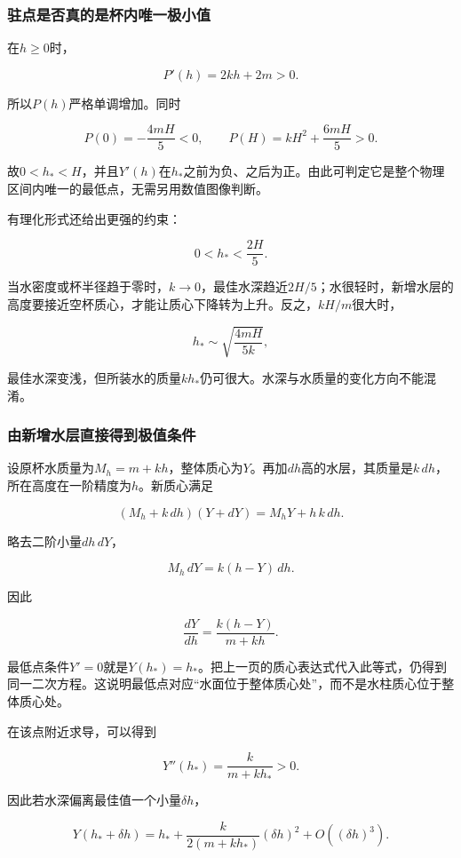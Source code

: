 \documentclass[12pt,a4paper,fontset=fandol]{ctexart}
\begin{document}
\subsubsection{驻点是否真的是杯内唯一极小值}\label{ux9a7bux70b9ux662fux5426ux771fux7684ux662fux676fux5185ux552fux4e00ux6781ux5c0fux503c}

在\(h\ge0\)时，

\[
P'(h)=2kh+2m>0.
\]

所以\(P(h)\)严格单调增加。同时

\[
P(0)=-\frac{4mH}{5}<0,\qquad
P(H)=kH^2+\frac{6mH}{5}>0.
\]

故\(0<h_*<H\)，并且\(Y'(h)\)在\(h_*\)之前为负、之后为正。由此可判定它是整个物理区间内唯一的最低点，无需另用数值图像判断。

有理化形式还给出更强的约束：

\[
0<h_*<\frac{2H}{5}.
\]

当水密度或杯半径趋于零时，\(k\to0\)，最佳水深趋近\(2H/5\)；水很轻时，新增水层的高度要接近空杯质心，才能让质心下降转为上升。反之，\(kH/m\)很大时，

\[
h_*\sim \sqrt{\frac{4mH}{5k}},
\]

最佳水深变浅，但所装水的质量\(kh_*\)仍可很大。水深与水质量的变化方向不能混淆。

\subsubsection{由新增水层直接得到极值条件}\label{ux7531ux65b0ux589eux6c34ux5c42ux76f4ux63a5ux5f97ux5230ux6781ux503cux6761ux4ef6}

设原杯水质量为\(M_h=m+kh\)，整体质心为\(Y\)。再加\(dh\)高的水层，其质量是\(k\,dh\)，所在高度在一阶精度为\(h\)。新质心满足

\[
(M_h+k\,dh)(Y+dY)=M_hY+h\,k\,dh.
\]

略去二阶小量\(dh\,dY\)，

\[
M_h\,dY=k(h-Y)\,dh.
\]

因此

\[
\boxed{\frac{dY}{dh}=\frac{k(h-Y)}{m+kh}}.
\]

最低点条件\(Y'=0\)就是\(Y(h_*)=h_*\)。把上一页的质心表达式代入此等式，仍得到同一二次方程。这说明最低点对应``水面位于整体质心处''，而不是水柱质心位于整体质心处。

在该点附近求导，可以得到

\[
Y''(h_*)=\frac{k}{m+kh_*}>0.
\]

因此若水深偏离最佳值一个小量\(\delta h\)，

\[
Y(h_*+\delta h)
=h_*+\frac{k}{2(m+kh_*)}(\delta h)^2
+O((\delta h)^3).
\]
\end{document}
